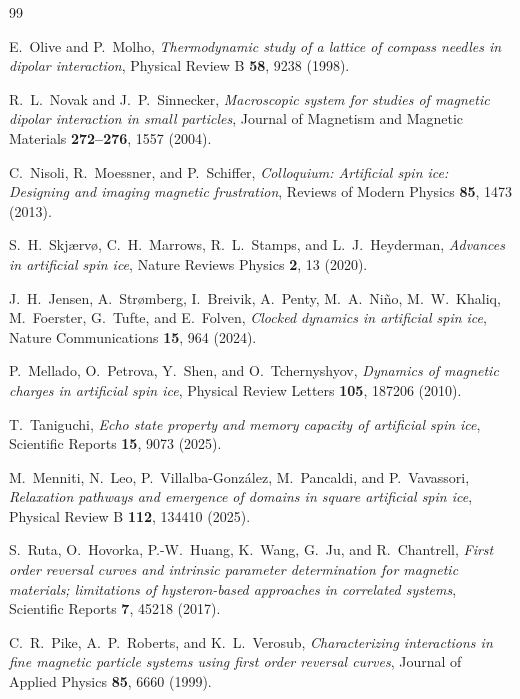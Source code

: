 \documentclass[11pt,a4paper]{article}
\begin{document}
\begin{thebibliography}{99}

E.~Olive and P.~Molho,
\emph{Thermodynamic study of a lattice of compass needles in dipolar interaction},
Physical Review B \textbf{58}, 9238 (1998).

R.~L.~Novak and J.~P.~Sinnecker,
\emph{Macroscopic system for studies of magnetic dipolar interaction in small particles},
Journal of Magnetism and Magnetic Materials \textbf{272--276}, 1557 (2004).

C.~Nisoli, R.~Moessner, and P.~Schiffer,
\emph{Colloquium: Artificial spin ice: Designing and imaging magnetic frustration},
Reviews of Modern Physics \textbf{85}, 1473 (2013).

S.~H.~Skj\ae rv\o, C.~H.~Marrows, R.~L.~Stamps, and L.~J.~Heyderman,
\emph{Advances in artificial spin ice},
Nature Reviews Physics \textbf{2}, 13 (2020).

J.~H.~Jensen, A.~Str\o mberg, I.~Breivik, A.~Penty, M.~A.~Ni\~no, M.~W.~Khaliq, M.~Foerster, G.~Tufte, and E.~Folven,
\emph{Clocked dynamics in artificial spin ice},
Nature Communications \textbf{15}, 964 (2024).

P.~Mellado, O.~Petrova, Y.~Shen, and O.~Tchernyshyov,
\emph{Dynamics of magnetic charges in artificial spin ice},
Physical Review Letters \textbf{105}, 187206 (2010).

T.~Taniguchi,
\emph{Echo state property and memory capacity of artificial spin ice},
Scientific Reports \textbf{15}, 9073 (2025).

M.~Menniti, N.~Leo, P.~Villalba-Gonz\'alez, M.~Pancaldi, and P.~Vavassori,
\emph{Relaxation pathways and emergence of domains in square artificial spin ice},
Physical Review B \textbf{112}, 134410 (2025).

S.~Ruta, O.~Hovorka, P.-W.~Huang, K.~Wang, G.~Ju, and R.~Chantrell,
\emph{First order reversal curves and intrinsic parameter determination for magnetic materials; limitations of hysteron-based approaches in correlated systems},
Scientific Reports \textbf{7}, 45218 (2017).

C.~R.~Pike, A.~P.~Roberts, and K.~L.~Verosub,
\emph{Characterizing interactions in fine magnetic particle systems using first order reversal curves},
Journal of Applied Physics \textbf{85}, 6660 (1999).


\end{thebibliography}
\end{document}
